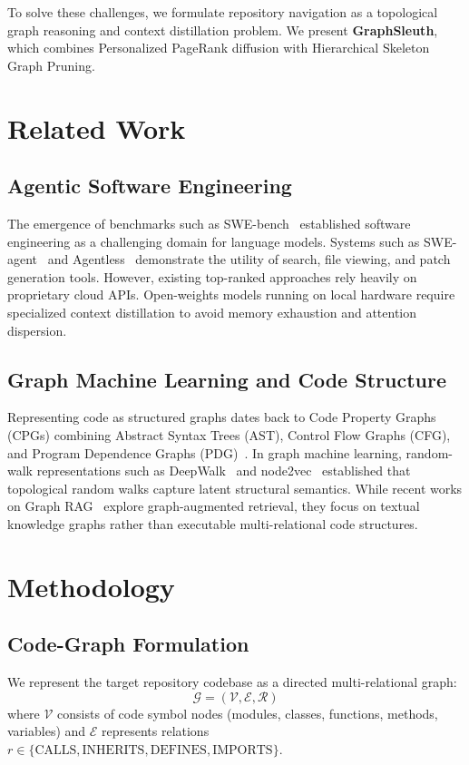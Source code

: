 \documentclass[11pt,a4paper]{article}
\theoremstyle{plain}
\theoremstyle{definition}
\begin{document}
To solve these challenges, we formulate repository navigation as a topological graph reasoning and context distillation problem. We present \textbf{GraphSleuth}, which combines Personalized PageRank diffusion with Hierarchical Skeleton Graph Pruning.

\section{Related Work}
\subsection{Agentic Software Engineering}
The emergence of benchmarks such as SWE-bench~\cite{jimenez2024swebench} established software engineering as a challenging domain for language models. Systems such as SWE-agent~\cite{yang2024sweagent} and Agentless~\cite{xia2024agentless} demonstrate the utility of search, file viewing, and patch generation tools. However, existing top-ranked approaches rely heavily on proprietary cloud APIs. Open-weights models running on local hardware require specialized context distillation to avoid memory exhaustion and attention dispersion.

\subsection{Graph Machine Learning and Code Structure}
Representing code as structured graphs dates back to Code Property Graphs (CPGs) combining Abstract Syntax Trees (AST), Control Flow Graphs (CFG), and Program Dependence Graphs (PDG)~\cite{yamaguchi2014modeling}. In graph machine learning, random-walk representations such as DeepWalk~\cite{perozzi2014deepwalk} and node2vec~\cite{grover2016node2vec} established that topological random walks capture latent structural semantics. While recent works on Graph RAG~\cite{edge2024graphrag} explore graph-augmented retrieval, they focus on textual knowledge graphs rather than executable multi-relational code structures.

\section{Methodology}
\subsection{Code-Graph Formulation}
We represent the target repository codebase as a directed multi-relational graph:
\begin{equation}
\mathcal{G} = (\mathcal{V}, \mathcal{E}, \mathcal{R})
\end{equation}
where $\mathcal{V}$ consists of code symbol nodes (modules, classes, functions, methods, variables) and $\mathcal{E}$ represents relations $r \in \{\text{CALLS}, \text{INHERITS}, \text{DEFINES}, \text{IMPORTS}\}$.
\end{document}
